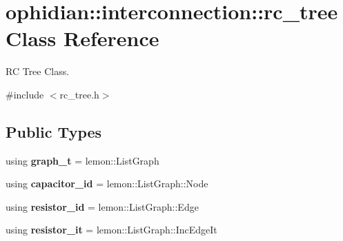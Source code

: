 \hypertarget{classophidian_1_1interconnection_1_1rc__tree}{\section{ophidian\-:\-:interconnection\-:\-:rc\-\_\-tree Class Reference}
\label{classophidian_1_1interconnection_1_1rc__tree}
}


R\-C Tree Class.  




{\ttfamily \#include $<$rc\-\_\-tree.\-h$>$}

\subsection*{Public Types}
\begin{DoxyCompactItemize}
\item 
\hypertarget{classophidian_1_1interconnection_1_1rc__tree_a3150567e8388e615a01021accf9544a2}{using {\bfseries graph\-\_\-t} = lemon\-::\-List\-Graph}\label{classophidian_1_1interconnection_1_1rc__tree_a3150567e8388e615a01021accf9544a2}

\item 
\hypertarget{classophidian_1_1interconnection_1_1rc__tree_a924f23b7ccb8c4fcc9a0782efd0fd96b}{using {\bfseries capacitor\-\_\-id} = lemon\-::\-List\-Graph\-::\-Node}\label{classophidian_1_1interconnection_1_1rc__tree_a924f23b7ccb8c4fcc9a0782efd0fd96b}

\item 
\hypertarget{classophidian_1_1interconnection_1_1rc__tree_a6f88448d10474e21d5c341f598154b0a}{using {\bfseries resistor\-\_\-id} = lemon\-::\-List\-Graph\-::\-Edge}\label{classophidian_1_1interconnection_1_1rc__tree_a6f88448d10474e21d5c341f598154b0a}

\item 
\hypertarget{classophidian_1_1interconnection_1_1rc__tree_abd7eab88b02ff1c1f70e2f6f6fe495b7}{using {\bfseries resistor\-\_\-it} = lemon\-::\-List\-Graph\-::\-Inc\-Edge\-It}\label{classophidian_1_1interconnection_1_1rc__tree_abd7eab88b02ff1c1f70e2f6f6fe495b7}

\end{DoxyCompactItemize}
